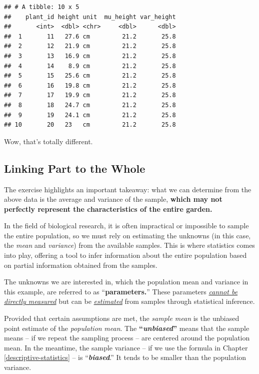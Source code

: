 \documentclass[
]{article}
\begin{document}
\begin{verbatim}
## # A tibble: 10 x 5
##    plant_id height unit  mu_height var_height
##       <int>  <dbl> <chr>     <dbl>      <dbl>
##  1       11   27.6 cm         21.2       25.8
##  2       12   21.9 cm         21.2       25.8
##  3       13   16.9 cm         21.2       25.8
##  4       14    8.9 cm         21.2       25.8
##  5       15   25.6 cm         21.2       25.8
##  6       16   19.8 cm         21.2       25.8
##  7       17   19.9 cm         21.2       25.8
##  8       18   24.7 cm         21.2       25.8
##  9       19   24.1 cm         21.2       25.8
## 10       20   23   cm         21.2       25.8
\end{verbatim}

Wow, that's totally different.

\hypertarget{linking-part-to-the-whole}{%
\subsection{Linking Part to the Whole}\label{linking-part-to-the-whole}}

The exercise highlights an important takeaway: what we can determine from the above data is the average and variance of the sample, \textbf{which may not perfectly represent the characteristics of the entire garden.}

In the field of biological research, it is often impractical or impossible to sample the entire population, so we must rely on estimating the unknowns (in this case, the \emph{mean} and \emph{variance}) from the available samples. This is where statistics comes into play, offering a tool to infer information about the entire population based on partial information obtained from the samples.

The unknowns we are interested in, which the population mean and variance in this example, are referred to as ``\textbf{parameters.}'' These parameters \uline{\emph{cannot be directly measured}} but can be \uline{\emph{estimated}} from samples through statistical inference.

Provided that certain assumptions are met, the \emph{sample mean} is the unbiased point estimate of the \emph{population} \emph{mean}. The \textbf{``\emph{unbiased}''} means that the sample means -- if we repeat the sampling process -- are centered around the population mean. In the meantime, the sample variance -- if we use the formula in Chapter \ref{descriptive-statistics} -- is ``\textbf{\emph{biased}}.'' It tends to be smaller than the population variance.
\end{document}
